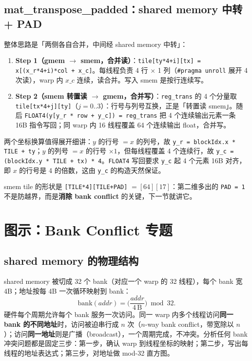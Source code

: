 \subsection{mat\_transpose\_padded：shared memory 中转 + PAD}



整体思路是「两侧各自合并，中间经 shared memory 中转」：
\begin{enumerate}
  \item \textbf{Step 1（gmem $\to$ smem，合并读）}：\texttt{tile[ty*4+i][tx] =\allowbreak{} x[\allowbreak{}(x\_\allowbreak{}r*4+i)*col + x\_\allowbreak{}c]}。每线程负责 4 行 $\times$ 1 列（\texttt{\#pragma unroll} 展开 4 次读），warp 内 $x\_c$ 连续，读合并。写入 smem 是按行连续写。
  \item \textbf{Step 2（smem 转置读 $\to$ gmem，合并写）}：\texttt{reg\_trans} 的 4 个分量取 \texttt{tile[tx*4+j][ty]}（$j = 0..3$）：行号与列号互换，正是「转置读 smem」。随后 \texttt{FLOAT4\allowbreak{}(y[y\_\allowbreak{}r * row + y\_\allowbreak{}c]) =\allowbreak{} reg\_\allowbreak{}trans} 把 4 个连续输出元素一条 16B 指令写回；同 warp 内 16 线程覆盖 64 个连续输出 float，合并写。
\end{enumerate}
两个坐标换算值得展开细讲：$y$ 的行号 $= x$ 的列号，故 \texttt{y\_r = blockIdx.x * TILE + ty}；$y$ 的列号 $= x$ 的行号 $\times 1$，但每线程覆盖 4 个连续行，故 \texttt{y\_c = (blockIdx.y * TILE + tx) * 4}。\texttt{FLOAT4} 写回要求 \texttt{y\_c} 起 4 个元素 16B 对齐，即 $x$ 的行号是 4 的倍数，这由 \texttt{y\_c} 的构造天然保证。

smem tile 的形状是 \texttt{[TILE*4][TILE+PAD]} $= [64][17]$：第二维多出的 \texttt{PAD = 1} 不是防越界，而是\textbf{消除 bank conflict} 的关键，下一节就讲它。

\section{图示：Bank Conflict 专题}

\subsection{shared memory 的物理结构}

shared memory 被切成 32 个 bank（对应一个 warp 的 32 线程），每个 bank 宽 4B；地址按每 4B 一次循环映射到 bank：
\begin{equation}
  \mathrm{bank}(addr) = \Big(\frac{addr}{4\,\mathrm{B}}\Big) \bmod 32 .
\end{equation}
硬件每个周期允许每个 bank 服务一次访问。同一 warp 内多个线程访问\textbf{同一 bank 的不同地址}时，访问被迫串行成 $n$ 次（$n$-way bank conflict，带宽除以 $n$）；访问\textbf{同一地址}则是广播（broadcast），一个周期完成，不冲突。分析任何 bank 冲突问题都是固定三步：第一步，确认 warp 到线程坐标的映射；第二步，写出每线程的地址表达式；第三步，对地址做 mod-32 直方图。

